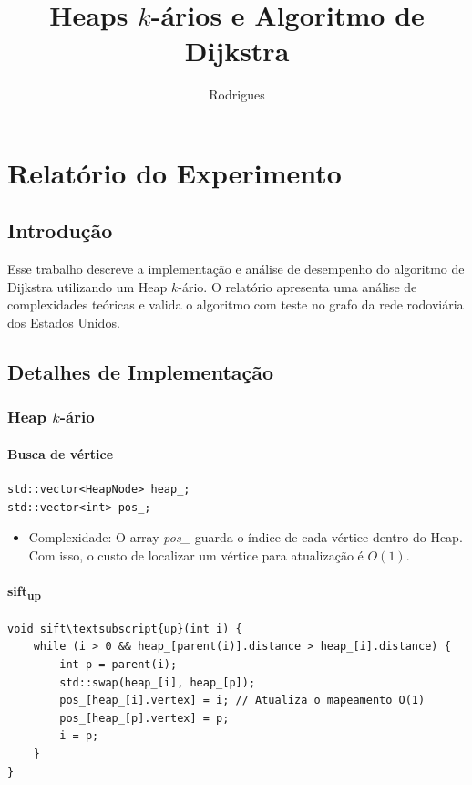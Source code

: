 \documentclass{infufrgs}
\title{Heaps $k$-ários e Algoritmo de Dijkstra}
\author{Rodrigues}{Juliana}
\begin{document}
\maketitle



\chapter{Relatório do Experimento}
\section{Introdução}
Esse trabalho descreve a implementação e análise 
de desempenho do algoritmo de Dijkstra utilizando um Heap $k$-ário. 
O relatório apresenta uma análise de complexidades teóricas e valida o algoritmo com teste no grafo da
 rede rodoviária dos Estados Unidos.  


\section{Detalhes de Implementação}

\subsection{Heap $k$-ário}
%
%
\subsubsection{Busca de vértice}
\begin{Verbatim}[frame=single, fontsize=\footnotesize]
std::vector<HeapNode> heap_; 
std::vector<int> pos_;       
\end{Verbatim}

\begin{itemize}
    \item Complexidade: O array \textit{pos\_} guarda o índice de cada vértice dentro do Heap.
     Com isso, o custo de localizar um vértice para atualização é $O(1)$.
\end{itemize}


%
%
\subsubsection{sift\textsubscript{up}}
\begin{Verbatim}[frame=single, fontsize=\footnotesize]
    void sift\textsubscript{up}(int i) {
    while (i > 0 && heap_[parent(i)].distance > heap_[i].distance) {
        int p = parent(i);
        std::swap(heap_[i], heap_[p]);
        pos_[heap_[i].vertex] = i; // Atualiza o mapeamento O(1)
        pos_[heap_[p].vertex] = p;
        i = p;
    }
}
\end{Verbatim}
\end{document}
